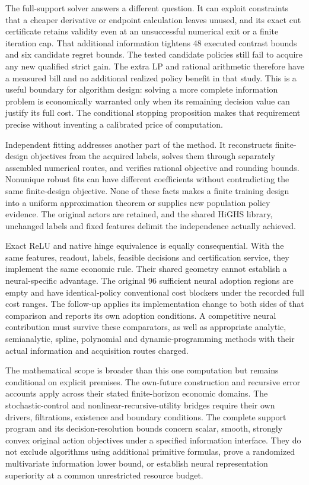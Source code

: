 The full-support solver answers a different question. It can exploit constraints
that a cheaper derivative or endpoint calculation leaves unused, and its exact
cut certificate retains validity even at an unsuccessful numerical exit or a
finite iteration cap. That additional information tightens 48 executed contrast
bounds and six candidate regret bounds. The tested candidate policies still
fail to acquire any new qualified strict gain. The extra LP and rational
arithmetic therefore have a measured bill and no additional realized policy
benefit in that study. This is a useful boundary for algorithm design: solving
a more complete information problem is economically warranted only when its
remaining decision value can justify its full cost. The conditional stopping
proposition makes that requirement precise without inventing a calibrated
price of computation.

Independent fitting addresses another part of the method. It reconstructs
finite-design objectives from the acquired labels, solves them through
separately assembled numerical routes, and verifies rational objective and
rounding bounds. Nonunique robust fits can have different coefficients without
contradicting the same finite-design objective. None of these facts makes a
finite training design into a uniform approximation theorem or supplies new
population policy evidence. The original actors are retained, and the shared
HiGHS library, unchanged labels and fixed features delimit the independence
actually achieved.

Exact ReLU and native hinge equivalence is equally consequential. With the same
features, readout, labels, feasible decisions and certification service, they
implement the same economic rule. Their shared geometry cannot establish a
neural-specific advantage. The original 96 sufficient neural adoption regions
are empty and have identical-policy conventional cost blockers under the
recorded full cost ranges. The follow-up applies its implementation change to
both sides of that comparison and reports its own adoption conditions. A
competitive neural contribution must survive these comparators, as well as
appropriate analytic, semianalytic, spline, polynomial and dynamic-programming
methods with their actual information and acquisition routes charged.

The mathematical scope is broader than this one computation but remains
conditional on explicit premises. The own-future construction and recursive
error accounts apply across their stated finite-horizon economic domains.
The stochastic-control and nonlinear-recursive-utility bridges require their
own drivers, filtrations, existence and boundary conditions. The complete
support program and its decision-resolution bounds concern scalar, smooth,
strongly convex original action objectives under a specified information
interface. They do not exclude algorithms using additional primitive formulas,
prove a randomized multivariate information lower bound, or establish neural
representation superiority at a common unrestricted resource budget.

